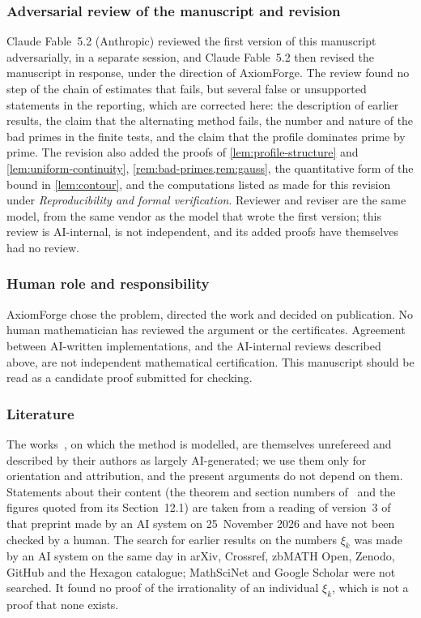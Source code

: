 \subsubsection*{Adversarial review of the manuscript and revision}
Claude Fable~5.2 (Anthropic) reviewed the first version of this manuscript adversarially, in a
separate session, and Claude Fable~5.2 then revised the manuscript in response, under the
direction of AxiomForge. The review found no step of the chain of estimates that fails, but
several false or unsupported statements in the reporting, which are corrected here: the
description of earlier results, the claim that the alternating method fails, the number and
nature of the bad primes in the finite tests, and the claim that the profile dominates prime by
prime. The revision also added the proofs of \cref{lem:profile-structure} and
\cref{lem:uniform-continuity}, \cref{rem:bad-primes,rem:gauss}, the quantitative form of the bound
in \cref{lem:contour}, and the computations listed as made for this revision under
\emph{Reproducibility and formal verification}. Reviewer and reviser are the same model, from the
same vendor as the model that wrote the first version; this review is AI-internal, is not
independent, and its added proofs have themselves had no review.

\subsubsection*{Human role and responsibility}
AxiomForge chose the problem, directed the work and decided on publication. No human mathematician has reviewed the argument or the
certificates. Agreement between AI-written implementations, and the AI-internal reviews described
above, are not independent mathematical certification. This manuscript should be
read as a candidate proof submitted for checking.

\subsubsection*{Literature}
The works~\cite{Litsey2026Lowner,OpenAICatalan2026}, on which the method is modelled, are
themselves unrefereed and described by their authors as largely AI-generated; we use them only for
orientation and attribution, and the present arguments do not depend on them. Statements about
their content (the theorem and section numbers of~\cite{Litsey2026Lowner} and the figures quoted
from its Section~12.1) are taken from a reading of version~3 of that preprint made by an AI system
on 25~November 2026 and have not been checked by a human. The search for earlier results on the
numbers $\xi_k$ was made by an AI system on the same day in arXiv, Crossref, zbMATH Open, Zenodo,
GitHub and the Hexagon catalogue; MathSciNet and Google Scholar were not searched. It found no
proof of the irrationality of an individual $\xi_k$, which is not a proof that none exists.

